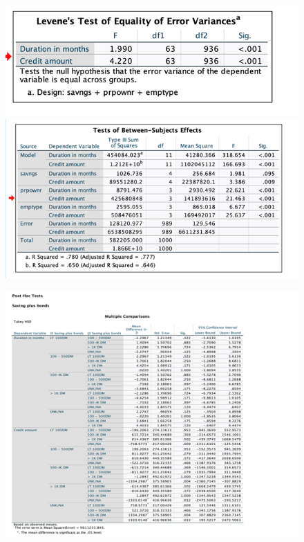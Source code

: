 \documentclass[english,10pt,a4paper]{article}
\begin{document}
	
		\begin{figure}[h]
		
		
		\includegraphics[width=1.5\linewidth]{Levene's testQ1}
		\includegraphics[width=1.5\linewidth]{Test between subject effectQ1}
	\end{figure}
	
	\begin{figure}[h]
		
		
		\includegraphics[width=2\linewidth]{Multiple comparison(savings plus bonus)}
	\end{figure}
	
\end{document}
